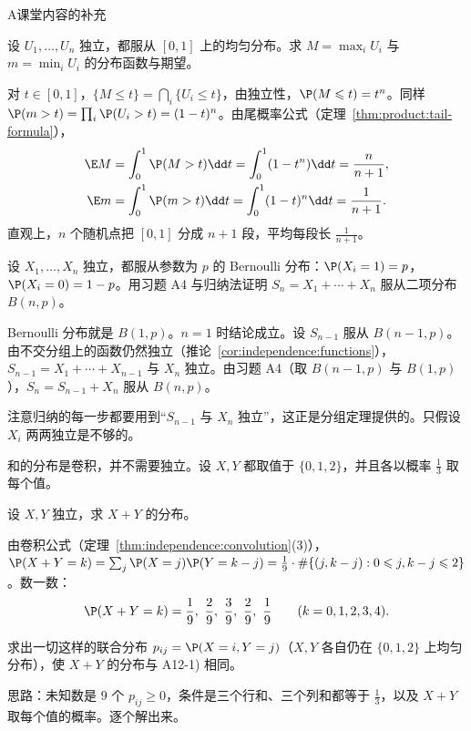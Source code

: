 \begin{exercises}{A}{课堂内容的补充}
\item\label{ex:independence:A10} 设 $U_1,\dots,U_n$ 独立，都服从 $[0,1]$ 上的均匀分布。求 $M=\max_iU_i$ 与 $m=\min_iU_i$ 的分布函数与期望。
\begin{solution}
对 $t\in[0,1]$，$\{M\leqslant t\}=\bigcap_i\{U_i\leqslant t\}$，由独立性，$\P(M\leqslant t)=t^n$。同样 $\P(m>t)=\prod_i\P(U_i>t)=(1-t)^n$。由尾概率公式（定理~\ref{thm:product:tail-formula}），
\[
\begin{aligned}
\E M&=\int_0^1\P(M>t)\dd t=\int_0^1(1-t^n)\dd t=\frac n{n+1},\\
\E m&=\int_0^1\P(m>t)\dd t=\int_0^1(1-t)^n\dd t=\frac1{n+1}.
\end{aligned}
\]
直观上，$n$ 个随机点把 $[0,1]$ 分成 $n+1$ 段，平均每段长 $\frac1{n+1}$。
\end{solution}

\item\label{ex:independence:A11} 设 $X_1,\dots,X_n$ 独立，都服从参数为 $p$ 的 Bernoulli 分布：$\P(X_i=1)=p$，$\P(X_i=0)=1-p$。用习题 A4 与归纳法证明 $S_n=X_1+\cdots+X_n$ 服从二项分布 $B(n,p)$。
\begin{solution}
Bernoulli 分布就是 $B(1,p)$。$n=1$ 时结论成立。设 $S_{n-1}$ 服从 $B(n-1,p)$。由不交分组上的函数仍然独立（推论~\ref{cor:independence:functions}），$S_{n-1}=X_1+\cdots+X_{n-1}$ 与 $X_n$ 独立。由习题 A4（取 $B(n-1,p)$ 与 $B(1,p)$），$S_n=S_{n-1}+X_n$ 服从 $B(n,p)$。

注意归纳的每一步都要用到“$S_{n-1}$ 与 $X_n$ 独立”，这正是分组定理提供的。只假设 $X_i$ 两两独立是不够的。
\end{solution}

\item\label{ex:independence:A12} 和的分布是卷积，并不需要独立。设 $X,Y$ 都取值于 $\{0,1,2\}$，并且各以概率 $\frac13$ 取每个值。
\begin{questions}
\item 设 $X,Y$ 独立，求 $X+Y$ 的分布。
\begin{solution}
由卷积公式（定理~\ref{thm:independence:convolution}(3)），$\P(X+Y=k)=\sum_j\P(X=j)\P(Y=k-j)=\frac19\cdot\#\{(j,k-j):0\leqslant j,k-j\leqslant2\}$。数一数：
\[
\P(X+Y=k)=\frac19,\ \frac29,\ \frac39,\ \frac29,\ \frac19\qquad(k=0,1,2,3,4).
\]
\end{solution}
\item 求出一切这样的联合分布 $p_{ij}=\P(X=i,Y=j)$（$X,Y$ 各自仍在 $\{0,1,2\}$ 上均匀分布），使 $X+Y$ 的分布与 A12-1) 相同。
\begin{solution}
思路：未知数是 $9$ 个 $p_{ij}\geqslant0$，条件是三个行和、三个列和都等于 $\frac13$，以及 $X+Y$ 取每个值的概率。逐个解出来。


\end{solution}
\end{questions}
\end{exercises}
